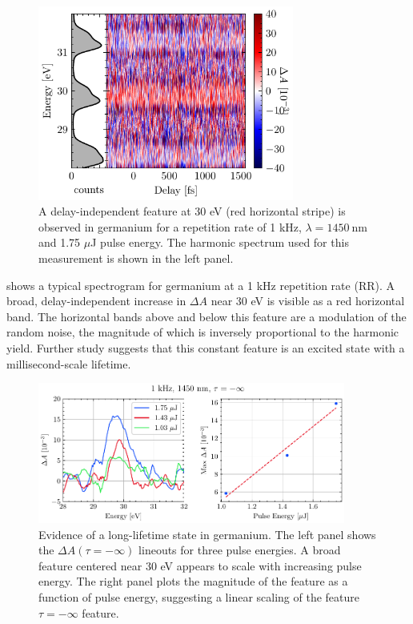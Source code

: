 \begin{figure}
	\centering
	\includegraphics[width=0.75\textwidth]{figures/chap4/ODvsDelay_1kHz_1p75uJ_dark.pdf}
	\caption{A delay-independent feature at 30 eV (red horizontal stripe) is observed in germanium for a repetition rate of 1 kHz, $\lambda = 1450 \ \textrm{nm}$ and 1.75 $\mu$J pulse energy. The harmonic spectrum used for this measurement is shown in the left panel.}
	\label{fig:ODvsDelay_1kHz_1p75uJ_dark}
\end{figure}

 shows a typical spectrogram for germanium at a 1 kHz repetition rate (RR). A broad, delay-independent increase in $\Delta A$ near 30 eV is visible as a red horizontal band. The horizontal bands above and below this feature are a modulation of the random noise, the magnitude of which is inversely proportional to the harmonic yield. Further study suggests that this constant feature is an excited state with a millisecond-scale lifetime.

\begin{figure}
	\centering
	\includegraphics[width=0.90\textwidth]{figures/chap4/neg_inf_PulseEnergy_scaling_1kHz.pdf}
	\caption{Evidence of a long-lifetime state in germanium. The left panel shows the $\Delta A(\tau=-\infty)$ lineouts for three pulse energies. A broad feature centered near 30 eV appears to scale with increasing pulse energy. The right panel plots the magnitude of the feature as a function of pulse energy, suggesting a linear scaling of the feature $\tau=-\infty$ feature.}
	\label{fig:neg_inf_PulseEnergy_scaling_1kHz}
\end{figure}

